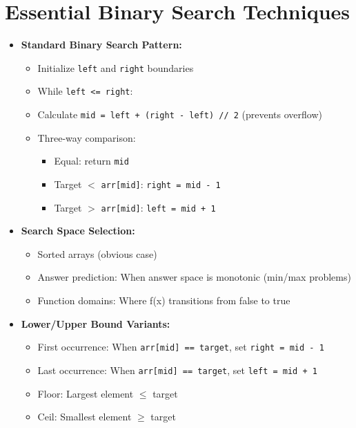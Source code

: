 \documentclass[a4paper,10pt]{book}
\begin{document}
\chapter{Essential Binary Search Techniques  }
\label{sec:search}
\begin{itemize}
    \item \textbf{Standard Binary Search Pattern:}
    \begin{itemize}
        \item Initialize \texttt{left} and \texttt{right} boundaries
        \item While \texttt{left <= right}: 
        \item \quad Calculate \texttt{mid = left + (right - left) // 2} (prevents overflow)
        \item \quad Three-way comparison: 
        \begin{itemize}
            \item Equal: return \texttt{mid}
            \item Target $<$ \texttt{arr[mid]}: \texttt{right = mid - 1}
            \item Target $>$ \texttt{arr[mid]}: \texttt{left = mid + 1}
        \end{itemize}
    \end{itemize}
    
    \item \textbf{Search Space Selection:}
    \begin{itemize}
        \item Sorted arrays (obvious case)
        \item Answer prediction: When answer space is monotonic (min/max problems)
        \item Function domains: Where f(x) transitions from false to true
    \end{itemize}
    
    \item \textbf{Lower/Upper Bound Variants:}
    \begin{itemize}
        \item First occurrence: When \texttt{arr[mid] == target}, set \texttt{right = mid - 1}
        \item Last occurrence: When \texttt{arr[mid] == target}, set \texttt{left = mid + 1}
        \item Floor: Largest element $\leq$ target
        \item Ceil: Smallest element $\geq$ target
    \end{itemize}
    

\end{itemize}
\end{document}
